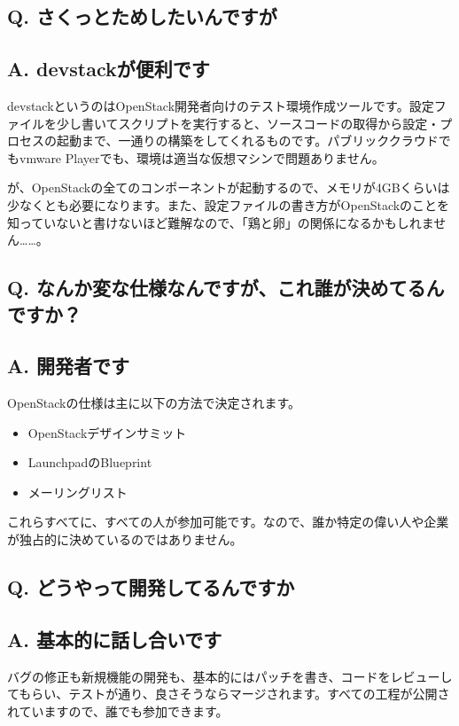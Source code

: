 \documentclass[9pt,b5paper,tombo,openany]{jsbook}
\begin{document}
\subsection*{{\LARGE\bfseries Q.} さくっとためしたいんですが}
\subsection*{{\LARGE\bfseries A.} devstackが便利です}
devstackというのはOpenStack開発者向けのテスト環境作成ツールです。設定ファイルを少し書いてスクリプトを実行すると、ソースコードの取得から設定・プロセスの起動まで、一通りの構築をしてくれるものです。パブリッククラウドでもvmware Playerでも、環境は適当な仮想マシンで問題ありません。

が、OpenStackの全てのコンポーネントが起動するので、メモリが4GBくらいは少なくとも必要になります。また、設定ファイルの書き方がOpenStackのことを知っていないと書けないほど難解なので、「鶏と卵」の関係になるかもしれません……。

\subsection*{{\LARGE\bfseries Q.} なんか変な仕様なんですが、これ誰が決めてるんですか？}
\subsection*{{\LARGE\bfseries A.} 開発者です}
OpenStackの仕様は主に以下の方法で決定されます。
\begin{itemize}
	\item OpenStackデザインサミット
	\item LaunchpadのBlueprint
	\item メーリングリスト
\end{itemize}
これらすべてに、すべての人が参加可能です。なので、誰か特定の偉い人や企業が独占的に決めているのではありません。

\subsection*{{\LARGE\bfseries Q.} どうやって開発してるんですか}
\subsection*{{\LARGE\bfseries A.} 基本的に話し合いです}
バグの修正も新規機能の開発も、基本的にはパッチを書き、コードをレビューしてもらい、テストが通り、良さそうならマージされます。すべての工程が公開されていますので、誰でも参加できます。
\end{document}

